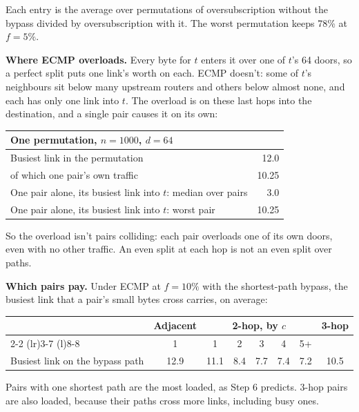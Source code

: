 \documentclass[11pt]{article}
\begin{document}
Each entry is the average over permutations of oversubscription without the bypass divided by oversubscription with it. The worst permutation keeps 78\% at $f = 5\%$.

\textbf{Where ECMP overloads.} Every byte for $t$ enters it over one of $t$'s 64 doors, so a perfect split puts one link's worth on each. ECMP doesn't: some of $t$'s neighbours sit below many upstream routers and others below almost none, and each has only one link into $t$. The overload is on these last hops into the destination, and a single pair causes it on its own:

\begin{center}
\begin{tabular}{@{}lr@{}}
\toprule
One permutation, $n = 1000$, $d = 64$ & \\
\midrule
Busiest link in the permutation & 12.0 \\
\quad of which one pair's own traffic & 10.25 \\
One pair alone, its busiest link into $t$: median over pairs & 3.0 \\
One pair alone, its busiest link into $t$: worst pair & 10.25 \\
\bottomrule
\end{tabular}
\end{center}

So the overload isn't pairs colliding: each pair overloads one of its own doors, even with no other traffic. An even split at each hop is not an even split over paths.

\textbf{Which pairs pay.} Under ECMP at $f = 10\%$ with the shortest-path bypass, the busiest link that a pair's small bytes cross carries, on average:

\begin{center}
\begin{tabular}{@{}lccccccc@{}}
\toprule
& \multicolumn{1}{c}{Adjacent} & \multicolumn{5}{c}{2-hop, by $c$} & 3-hop \\
\cmidrule(lr){2-2} \cmidrule(lr){3-7} \cmidrule(l){8-8}
& 1 & 1 & 2 & 3 & 4 & 5+ & \\
\midrule
Busiest link on the bypass path & 12.9 & 11.1 & 8.4 & 7.7 & 7.4 & 7.2 & 10.5 \\
\bottomrule
\end{tabular}
\end{center}

Pairs with one shortest path are the most loaded, as Step 6 predicts. 3-hop pairs are also loaded, because their paths cross more links, including busy ones.
\end{document}
